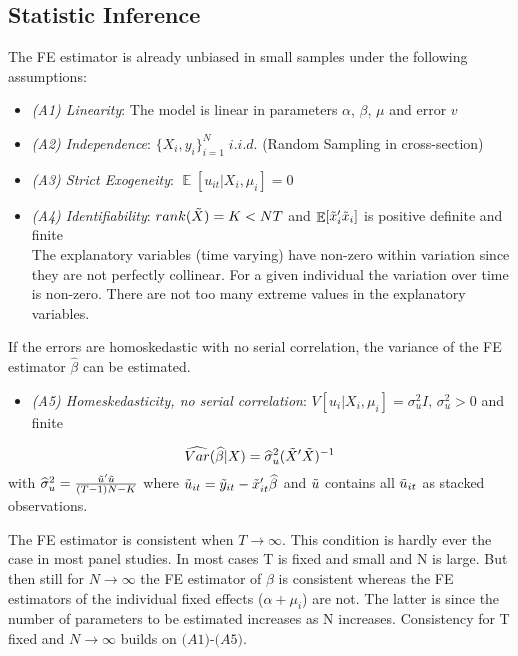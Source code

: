 \documentclass[11pt, a4paper, leqno]{article}
\begin{document}
\subsection{Statistic Inference}
The FE estimator is already unbiased in small samples under the following assumptions:
\begin{itemize}
    \item \textit{(A1) Linearity}: The model is linear in parameters $\alpha$, $\beta$, $\mu$ and error $v$
    \item \textit{(A2) Independence}: $\{ X_i, y_i \}_{i=1}^N \; i.i.d.$ (Random Sampling in cross-section)
    \item \textit{(A3) Strict Exogeneity}: $\mathop{\mathbb{E}}[u_{it}|X_i, \mu_i]=0$
    \item \textit{(A4) Identifiability}: $rank(\Tilde{X})=K<NT$ and $\mathop{\mathbb{E}}[\Tilde{x}_i'\Tilde{x}_i]$ is positive definite and finite\\
    The explanatory variables (time varying) have non-zero within variation since they are not perfectly collinear. For a given individual the variation over time is non-zero. There are not too many extreme values in the explanatory variables.
\end{itemize}
If the errors are homoskedastic with no serial correlation, the variance of the FE estimator $\hat{\beta}$ can be estimated.
\begin{itemize}
    \item \textit{(A5) Homeskedasticity, no serial correlation}: $V[u_i|X_i, \mu_i]=\sigma_u^2I,\,\sigma_u^2>0$ and finite
\end{itemize}
\begin{equation}
    \widehat{Var}(\widehat{\beta}|X)=\widehat{\sigma}_u^2(\Tilde{X}'\Tilde{X})^{-1}
\end{equation}
with $\widehat{\sigma}_u^2=\frac{\Tilde{u}'\Tilde{u}}{(T-1)N-K}$ where $\Tilde{u}_{it}=\Tilde{y}_{it}-\Tilde{x}_{it}'\widehat{\beta}$ and $\Tilde{u}$ contains all $\Tilde{u}_{it}$ as stacked observations.

The FE estimator is consistent when $T\xrightarrow{}\infty$. This condition is hardly ever the case in most panel studies. In most cases T is fixed and small and N is large. But then still for $N\xrightarrow{}\infty$ the FE estimator of $\beta$ is consistent whereas the FE estimators of the individual fixed effects ($\alpha+\mu_i$) are not. The latter is since the number of parameters to be estimated increases as N increases. Consistency for T fixed and $N\xrightarrow{}\infty$ builds on $\textit{(A1)-(A5)}$.
\end{document}
